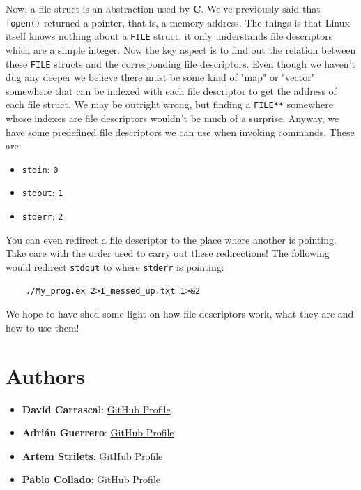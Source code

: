 \documentclass[12pt]{article}
\begin{document}
		Now, a file struct is an abstraction used by \textbf{C}. We've previously said that \texttt{fopen()} returned a pointer, that is, a memory address. The things is that Linux itself knows nothing about a \texttt{FILE} struct, it only understands file descriptors which are a simple integer. Now the key aspect is to find out the relation between these \texttt{FILE} structs and the corresponding file descriptors. Even though we haven't dug any deeper we believe there must be some kind of "map" or "vector" somewhere that can be indexed with each file descriptor to get the address of each file struct. We may be outright wrong, but finding a \texttt{FILE**} somewhere whose indexes are file descriptors wouldn't be much of a surprise. Anyway, we have some predefined file descriptors we can use when invoking commands. These are:

		\begin{itemize}
			\item \texttt{stdin}: \texttt{0}
			\item \texttt{stdout}: \texttt{1}
			\item \texttt{stderr}: \texttt{2}
		\end{itemize}

		You can even redirect a file descriptor to the place where another is pointing. Take care with the order used to carry out these redirections! The following would redirect \texttt{stdout} to where \texttt{stderr} is pointing:

		\begin{verbatim}
	./My_prog.ex 2>I_messed_up.txt 1>&2
		\end{verbatim}

		We hope to have shed some light on how file descriptors work, what they are and how to use them!

\section{Authors}

	\begin{itemize}
		\item \textbf{David Carrascal}: \href{https://github.com/davidcawork}{GitHub Profile}
		\item \textbf{Adrián Guerrero}: \href{https://github.com/adrihamel}{GitHub Profile}
		\item \textbf{Artem Strilets}: \href{https://github.com/pcolladosoto}{GitHub Profile}
		\item \textbf{Pablo Collado}: \href{https://github.com/ArtemSSOO}{GitHub Profile}
	\end{itemize}


{}
\end{document}
